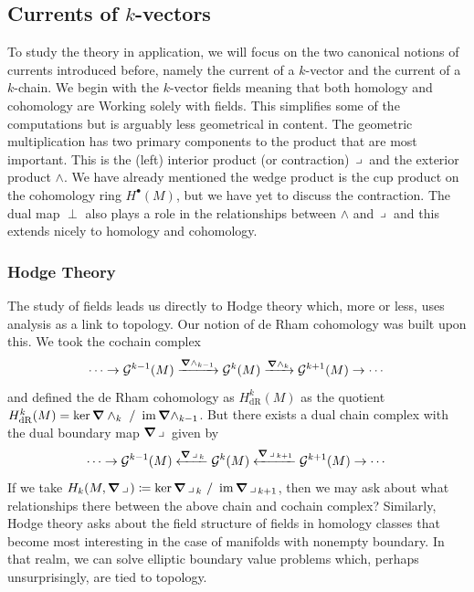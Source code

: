 \documentclass{article}
\begin{document}

\subsection{Currents of $k$-vectors}

To study the theory in application, we will focus on the two canonical notions of currents introduced before, namely the current of a $k$-vector and the current of a $k$-chain. We begin with the $k$-vector fields meaning that both homology and cohomology are Working solely with fields. This simplifies some of the computations but is arguably less geometrical in content. The geometric multiplication has two primary components to the product that are most important. This is the (left) interior product (or contraction) $\hspace*{.5mm}\lrcorner \hspace*{.5mm}$ and the exterior product $\wedge$. We have already mentioned the wedge product is the cup product on the cohomology ring $H^\bullet(M)$, but we have yet to discuss the contraction. The dual map $\perp$ also plays a role in the relationships between $\wedge$ and $\hspace*{.5mm}\lrcorner \hspace*{.5mm}$ and this extends nicely to homology and cohomology.

\subsubsection{Hodge Theory}

The study of fields leads us directly to Hodge theory which, more or less, uses analysis as a link to topology. Our notion of de Rham cohomology was built upon this. We took the cochain complex
\begin{equation}
\cdots \to \mathcal{G}^{k-1}(M) \xrightarrow{\boldsymbol{\nabla} \wedge_{k-1}} \mathcal{G}^k(M) \xrightarrow{\boldsymbol{\nabla} \wedge_{k}} \mathcal{G}^{k+1}(M) \to \cdots
\end{equation}
and defined the de Rham cohomology as $H^k_{\mathrm{dR}}(M)$ as the quotient $H^k_{\mathrm{dR}}(M) = \ker \boldsymbol{\nabla} \wedge_k ~ / ~ \operatorname{im} \boldsymbol{\nabla} \wedge_{k-1}$. But there exists a dual chain complex with the dual boundary map $\boldsymbol{\nabla} \hspace*{.5mm}\lrcorner \hspace*{.5mm}$ given by
\begin{equation}
\cdots \to \mathcal{G}^{k-1}(M) \xleftarrow{\boldsymbol{\nabla} \hspace*{.5mm}\lrcorner \hspace*{.5mm}_{k}} \mathcal{G}^k(M) \xleftarrow{\boldsymbol{\nabla} \hspace*{.5mm}\lrcorner \hspace*{.5mm}_{k+1}} \mathcal{G}^{k+1}(M) \to \cdots
\end{equation}
If we take $H_k(M,\boldsymbol{\nabla} \hspace*{.5mm}\lrcorner \hspace*{.5mm})\coloneqq \ker \boldsymbol{\nabla} \hspace*{.5mm}\lrcorner \hspace*{.5mm}_k ~ / ~ \operatorname{im} \boldsymbol{\nabla} \hspace*{.5mm}\lrcorner \hspace*{.5mm}_{k+1}$, then we may ask about what relationships there between the above chain and cochain complex? Similarly, Hodge theory asks about the field structure of fields in homology classes that become most interesting in the case of manifolds with nonempty boundary. In that realm, we can solve elliptic boundary value problems which, perhaps unsurprisingly, are tied to topology.
\end{document}
